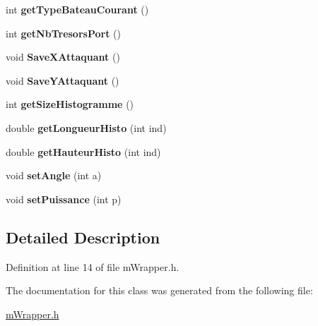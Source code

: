 \begin{DoxyCompactItemize}
\item 
\hypertarget{classm_wrapper_1_1_wrapper_facade_a337ad9b401b84c787f36536c287a01e1}{
int {\bfseries getTypeBateauCourant} ()}
\label{classm_wrapper_1_1_wrapper_facade_a337ad9b401b84c787f36536c287a01e1}

\item 
\hypertarget{classm_wrapper_1_1_wrapper_facade_a8fe9b2e2c4ea487e09f37fd6155ecc81}{
int {\bfseries getNbTresorsPort} ()}
\label{classm_wrapper_1_1_wrapper_facade_a8fe9b2e2c4ea487e09f37fd6155ecc81}

\item 
\hypertarget{classm_wrapper_1_1_wrapper_facade_adf1ed208afe916b3afcb398170826c1b}{
void {\bfseries SaveXAttaquant} ()}
\label{classm_wrapper_1_1_wrapper_facade_adf1ed208afe916b3afcb398170826c1b}

\item 
\hypertarget{classm_wrapper_1_1_wrapper_facade_a647d99f0107600a2efabde0093853de0}{
void {\bfseries SaveYAttaquant} ()}
\label{classm_wrapper_1_1_wrapper_facade_a647d99f0107600a2efabde0093853de0}

\item 
\hypertarget{classm_wrapper_1_1_wrapper_facade_a8a18157fbc5c3c80163e5eeb8ddba37f}{
int {\bfseries getSizeHistogramme} ()}
\label{classm_wrapper_1_1_wrapper_facade_a8a18157fbc5c3c80163e5eeb8ddba37f}

\item 
\hypertarget{classm_wrapper_1_1_wrapper_facade_abb3a008499613c31f5f63076de1492c4}{
double {\bfseries getLongueurHisto} (int ind)}
\label{classm_wrapper_1_1_wrapper_facade_abb3a008499613c31f5f63076de1492c4}

\item 
\hypertarget{classm_wrapper_1_1_wrapper_facade_a5bbb4b569a891499165c6ef8500e5f76}{
double {\bfseries getHauteurHisto} (int ind)}
\label{classm_wrapper_1_1_wrapper_facade_a5bbb4b569a891499165c6ef8500e5f76}

\item 
\hypertarget{classm_wrapper_1_1_wrapper_facade_aa54f419627b278a4cc11337d80f1ee48}{
void {\bfseries setAngle} (int a)}
\label{classm_wrapper_1_1_wrapper_facade_aa54f419627b278a4cc11337d80f1ee48}

\item 
\hypertarget{classm_wrapper_1_1_wrapper_facade_abff9051c6d4309934c7c5889a541a30d}{
void {\bfseries setPuissance} (int p)}
\label{classm_wrapper_1_1_wrapper_facade_abff9051c6d4309934c7c5889a541a30d}

\end{DoxyCompactItemize}


\subsection{Detailed Description}


Definition at line 14 of file mWrapper.h.



The documentation for this class was generated from the following file:\begin{DoxyCompactItemize}
\item 
\hyperlink{m_wrapper_8h}{mWrapper.h}\end{DoxyCompactItemize}
